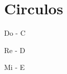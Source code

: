\section{Circulos}
\label{sec:circulos}

\noindent
Do - C \hspace{1cm}
\chordC
\chordAm
\chordDm
\chordGs

\vspace{1cm}

\noindent
Re - D \hspace{1cm}
\chordD
\chordBm
\chordEm
\chordAs

\vspace{1cm}

\noindent
Mi - E \hspace{1cm}
\chordE
\chordCshm
\chordFshm
\chordDs